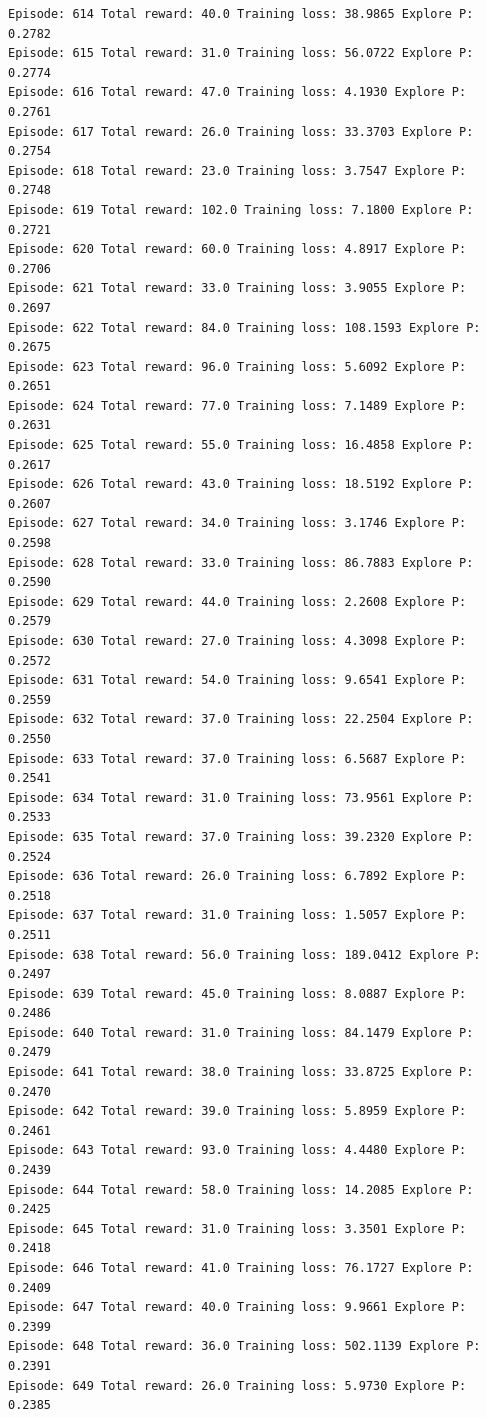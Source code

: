\documentclass[11pt]{article}
\begin{document}
\begin{Verbatim}[commandchars=\\\{\}]
Episode: 614 Total reward: 40.0 Training loss: 38.9865 Explore P: 0.2782
Episode: 615 Total reward: 31.0 Training loss: 56.0722 Explore P: 0.2774
Episode: 616 Total reward: 47.0 Training loss: 4.1930 Explore P: 0.2761
Episode: 617 Total reward: 26.0 Training loss: 33.3703 Explore P: 0.2754
Episode: 618 Total reward: 23.0 Training loss: 3.7547 Explore P: 0.2748
Episode: 619 Total reward: 102.0 Training loss: 7.1800 Explore P: 0.2721
Episode: 620 Total reward: 60.0 Training loss: 4.8917 Explore P: 0.2706
Episode: 621 Total reward: 33.0 Training loss: 3.9055 Explore P: 0.2697
Episode: 622 Total reward: 84.0 Training loss: 108.1593 Explore P: 0.2675
Episode: 623 Total reward: 96.0 Training loss: 5.6092 Explore P: 0.2651
Episode: 624 Total reward: 77.0 Training loss: 7.1489 Explore P: 0.2631
Episode: 625 Total reward: 55.0 Training loss: 16.4858 Explore P: 0.2617
Episode: 626 Total reward: 43.0 Training loss: 18.5192 Explore P: 0.2607
Episode: 627 Total reward: 34.0 Training loss: 3.1746 Explore P: 0.2598
Episode: 628 Total reward: 33.0 Training loss: 86.7883 Explore P: 0.2590
Episode: 629 Total reward: 44.0 Training loss: 2.2608 Explore P: 0.2579
Episode: 630 Total reward: 27.0 Training loss: 4.3098 Explore P: 0.2572
Episode: 631 Total reward: 54.0 Training loss: 9.6541 Explore P: 0.2559
Episode: 632 Total reward: 37.0 Training loss: 22.2504 Explore P: 0.2550
Episode: 633 Total reward: 37.0 Training loss: 6.5687 Explore P: 0.2541
Episode: 634 Total reward: 31.0 Training loss: 73.9561 Explore P: 0.2533
Episode: 635 Total reward: 37.0 Training loss: 39.2320 Explore P: 0.2524
Episode: 636 Total reward: 26.0 Training loss: 6.7892 Explore P: 0.2518
Episode: 637 Total reward: 31.0 Training loss: 1.5057 Explore P: 0.2511
Episode: 638 Total reward: 56.0 Training loss: 189.0412 Explore P: 0.2497
Episode: 639 Total reward: 45.0 Training loss: 8.0887 Explore P: 0.2486
Episode: 640 Total reward: 31.0 Training loss: 84.1479 Explore P: 0.2479
Episode: 641 Total reward: 38.0 Training loss: 33.8725 Explore P: 0.2470
Episode: 642 Total reward: 39.0 Training loss: 5.8959 Explore P: 0.2461
Episode: 643 Total reward: 93.0 Training loss: 4.4480 Explore P: 0.2439
Episode: 644 Total reward: 58.0 Training loss: 14.2085 Explore P: 0.2425
Episode: 645 Total reward: 31.0 Training loss: 3.3501 Explore P: 0.2418
Episode: 646 Total reward: 41.0 Training loss: 76.1727 Explore P: 0.2409
Episode: 647 Total reward: 40.0 Training loss: 9.9661 Explore P: 0.2399
Episode: 648 Total reward: 36.0 Training loss: 502.1139 Explore P: 0.2391
Episode: 649 Total reward: 26.0 Training loss: 5.9730 Explore P: 0.2385

\end{Verbatim}
\end{document}
